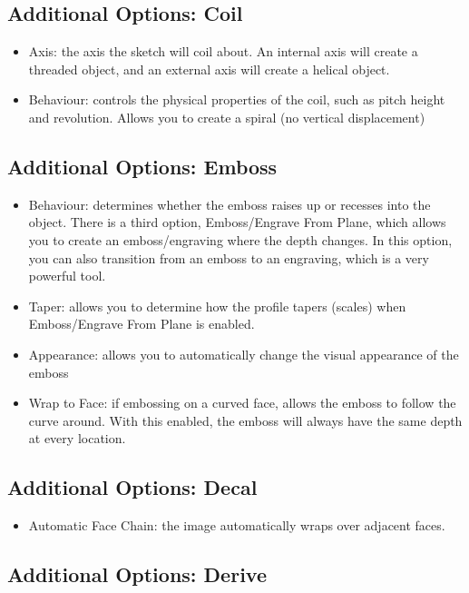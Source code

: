 \subsection{Additional Options: Coil}

\begin{itemize}
\item Axis: the axis the sketch will coil about. An internal axis will create a threaded object, and an external axis will create a helical object.
\item Behaviour: controls the physical properties of the coil, such as pitch height and revolution. Allows you to create a spiral (no vertical displacement)
\end{itemize}

\subsection{Additional Options: Emboss}

\begin{itemize}
\item Behaviour: determines whether the emboss raises up or recesses into the object. There is a third option, Emboss/Engrave From Plane, which allows you to create an emboss/engraving where the depth changes. In this option, you can also transition from an emboss to an engraving, which is a very powerful tool.
\item Taper: allows you to determine how the profile tapers (scales) when Emboss/Engrave From Plane is enabled.
\item Appearance: allows you to automatically change the visual appearance of the emboss
\item Wrap to Face: if embossing on a curved face, allows the emboss to follow the curve around. With this enabled, the emboss will always have the same depth at every location.
\end{itemize}

\subsection{Additional Options: Decal}

\begin{itemize}
    \item Automatic Face Chain: the image automatically wraps over adjacent faces.
\end{itemize}

\subsection{Additional Options: Derive}

